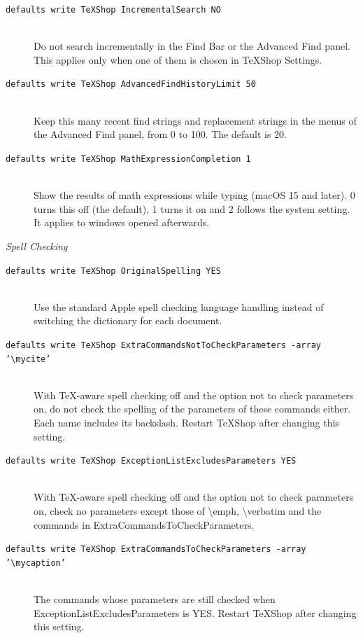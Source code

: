 \documentclass[11pt, oneside]{article}   	%
\begin{document}
\begin{description}
\item[\texttt{defaults write TeXShop IncrementalSearch NO}] \hfill \\
Do not search incrementally in the Find Bar or the Advanced Find panel. This applies only when one of them is chosen in TeXShop Settings.
\item[\texttt{defaults write TeXShop AdvancedFindHistoryLimit 50}] \hfill \\
Keep this many recent find strings and replacement strings in the menus of the Advanced Find panel, from 0 to 100. The default is 20.
\item[\texttt{defaults write TeXShop MathExpressionCompletion 1}] \hfill \\
Show the results of math expressions while typing (macOS 15 and later). 0 turns this off (the default), 1 turns it on and 2 follows the system setting. It applies to windows opened afterwards.
\end{description}

{\em Spell Checking}
\begin{description}
\item[\texttt{defaults write TeXShop OriginalSpelling YES}] \hfill \\
Use the standard Apple spell checking language handling instead of switching the dictionary for each document.
\item[\texttt{defaults write TeXShop ExtraCommandsNotToCheckParameters -array '\textbackslash mycite'}] \hfill \\
With TeX-aware spell checking off and the option not to check parameters on, do not check the spelling of the parameters of these commands either. Each name includes its backslash. Restart TeXShop after changing this setting.
\item[\texttt{defaults write TeXShop ExceptionListExcludesParameters YES}] \hfill \\
With TeX-aware spell checking off and the option not to check parameters on, check no parameters except those of \textbackslash emph, \textbackslash verbatim and the commands in ExtraCommandsToCheckParameters.
\item[\texttt{defaults write TeXShop ExtraCommandsToCheckParameters -array '\textbackslash mycaption'}] \hfill \\
The commands whose parameters are still checked when ExceptionListExcludesParameters is YES. Restart TeXShop after changing this setting.
\end{description}
\end{document}
